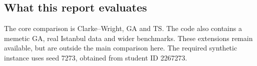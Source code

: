 \subsection*{What this report evaluates}
The core comparison is Clarke--Wright, GA and TS. The code also contains a memetic GA, real
Istanbul data and wider benchmarks. These extensions remain available, but are outside the main
comparison here. The required synthetic instance uses seed 7273, obtained from student ID 2267273.

